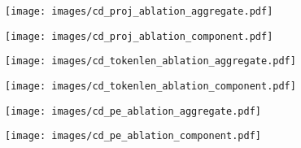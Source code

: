 \begin{figure*}[htbp]
    \vspace{1ex} %

    \begin{minipage}{0.48\textwidth}
        \centering
        \texttt{[image: images/cd\_proj\_ablation\_aggregate.pdf]}
        \label{fig:cd_proj_ablation_aggregate}
    \end{minipage}%
    \hfill
    \begin{minipage}{0.48\textwidth}
        \centering
        \texttt{[image: images/cd\_proj\_ablation\_component.pdf]}
        \label{fig:cd_proj_ablation_component}
    \end{minipage}

    \vspace{1ex} %

    \begin{minipage}{0.48\textwidth}
        \centering
        \texttt{[image: images/cd\_tokenlen\_ablation\_aggregate.pdf]}
        \label{fig:cd_tokenlen_ablation_aggregate}
    \end{minipage}%
    \hfill
    \begin{minipage}{0.48\textwidth}
        \centering
        \texttt{[image: images/cd\_tokenlen\_ablation\_component.pdf]}
        \label{fig:cd_tokenlen_ablation_component}
    \end{minipage}

    \vspace{1ex} %

    \begin{minipage}{0.48\textwidth}
        \centering
        \texttt{[image: images/cd\_pe\_ablation\_aggregate.pdf]}
        \label{fig:cd_pe_ablation_aggregate}
    \end{minipage}%
    \hfill
    \begin{minipage}{0.48\textwidth}
        \centering
        \texttt{[image: images/cd\_pe\_ablation\_component.pdf]}
        \label{fig:cd_pe_ablation_component}
    \end{minipage}
    

\end{figure*}
